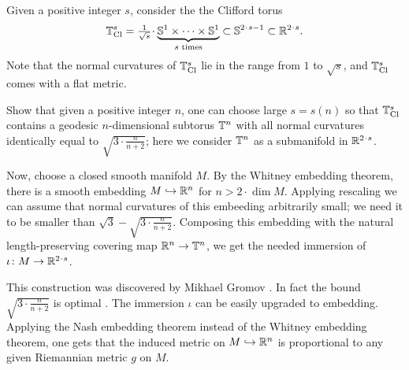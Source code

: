 Given a positive integer $s$,
consider the the Clifford torus
\[\TT^s_{\text{Cl}}=\tfrac1{\sqrt{s}}\cdot\underbrace{\SSS^1\times\dots\times\SSS^1}_\text{$s$ times}\subset\SSS^{2\cdot s-1}\subset\RR^{2\cdot s}.\]
Note that the normal curvatures of $\mathbb{T}^s_{\text{Cl}}$ lie in the range from $1$ to $\sqrt{s}$, and $\mathbb{T}^s_{\text{Cl}}$ comes with a flat metric.

Show that given a positive integer $n$, one can choose large $s=s(n)$
so that $\mathbb{T}^s_{\text{Cl}}$ contains a geodesic $n$-dimensional
subtorus $\mathbb{T}^n$ with all normal curvatures identically equal to $\sqrt{3\cdot\frac n{n+2}}$;
here we consider $\mathbb{T}^n$ as a submanifold in $\RR^{2\cdot s}$.

Now, choose a closed smooth manifold $M$.
By the Whitney embedding theorem, there is a smooth embedding $M\hookrightarrow\mathbb{R}^n$ for $n>2\cdot \dim M$.
Applying rescaling we can assume that normal curvatures of this embeeding arbitrarily small;
we need it to be smaller than $\sqrt{3}-\sqrt{3\cdot\frac n{n+2}}$.
Composing this embedding with the natural length-preserving covering map $\mathbb{R}^n\to \mathbb{T}^n$, we get the needed immersion of $\iota\:M\to \RR^{2\cdot s}$.
\qeds

This construction was discovered by Mikhael Gromov \cite[2.A]{gromov2022}.
In fact the bound $\sqrt{3\cdot\frac n{n+2}}$ is optimal \cite{petrunin2023}.
The immersion $\iota$ can be easily upgraded to embedding.
Applying the Nash embedding theorem instead of the Whitney embedding theorem,
one gets that the induced metric on $M\hookrightarrow\mathbb{R}^n$ is proportional to any given Riemannian metric $g$ on $M$.



